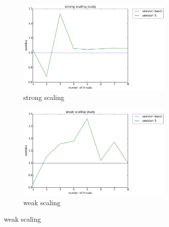 \documentclass[12pt]{article}
\numberwithin{equation}{section}
\begin{document}
\begin{figure}[!ht]
   \begin{subfigure}
      \centering
        \begin{center}
      \includegraphics[width=0.85\textwidth] {plots/cpp_strong_ivdep}
        \end{center}
      \label{aload0}
      \caption{strong scaling}
  \end{subfigure}
  \begin{subfigure}
      \centering
        \begin{center}
      \includegraphics[width=0.85\textwidth] {plots/cpp_weak_ivdep}
        \end{center}
      \label{aload1}
      \caption{weak scaling}
  \end{subfigure}

\end{figure}
\end{document}
